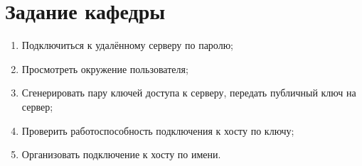 \thispagestyle{empty}
\section*{Задание кафедры}

\begin{enumerate}
    \item Подключиться к удалённому серверу по паролю;
    \item Просмотреть окружение пользователя;
    \item Сгенерировать пару ключей доступа к серверу, передать публичный ключ на сервер;
    \item Проверить работоспособность подключения к хосту по ключу;
    \item Организовать подключение к хосту по имени.
\end{enumerate}
